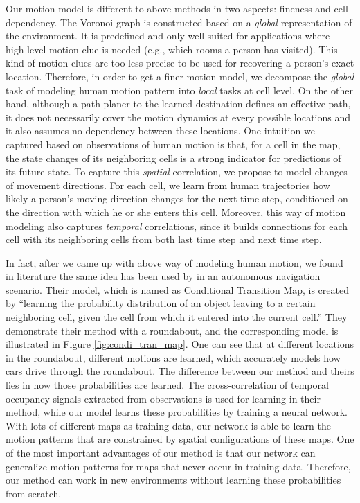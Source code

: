 Our motion model is different to above methods in two aspects: fineness and cell dependency. The Voronoi graph is constructed based on a \textit{global} representation of the environment. It is predefined and only well suited for applications where high-level motion clue is needed (e.g., which rooms a person has visited). This kind of motion clues are too less precise to be used for recovering a person's exact location. Therefore, in order to get a finer motion model, we decompose the \textit{global} task of modeling human motion pattern into \textit{local} tasks at cell level. On the other hand, although a path planer to the learned destination defines an effective path, it does not necessarily cover the motion dynamics at every possible locations and it also assumes no dependency between these locations. One intuition we captured based on observations of human motion is that, for a cell in the map, the state changes of its neighboring cells is a strong indicator for predictions of its future state. To capture this \textit{spatial} correlation, we propose to model changes of movement directions. For each cell, we learn from human trajectories how likely a person's moving direction changes for the next time step, conditioned on the direction with which he or she enters this cell. Moreover, this way of motion modeling also captures \textit{temporal} correlations, since it builds connections for each cell with its neighboring cells from both last time step and next time step. 

In fact, after we came up with above way of modeling human motion, we found in literature the same idea has been used by \citet{kucner2013conditional} in an autonomous navigation scenario. Their model, which is named as Conditional Transition Map, is created by ``learning the probability distribution of an object leaving to a certain neighboring cell, given the cell from which it entered into the current cell.'' They demonstrate their method with a roundabout, and the corresponding model is illustrated in Figure \ref{fig:condi_tran_map}. One can see that at different locations in the roundabout, different motions are learned, which accurately models how cars drive through the roundabout. The difference between our method and theirs lies in how those probabilities are learned. The cross-correlation of temporal occupancy signals extracted from observations is used for learning in their method, while our model learns these probabilities by training a neural network. With lots of different maps as training data, our network is able to learn the motion patterns that are constrained by spatial configurations of these maps. One of the most important advantages of our method is that our network can generalize motion patterns for maps that never occur in training data. Therefore, our method can work in new environments without learning these probabilities from scratch. 

